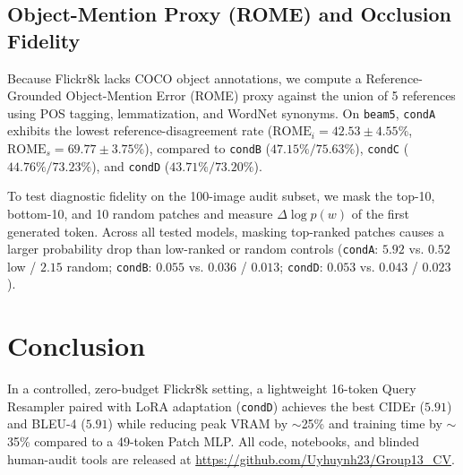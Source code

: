 \documentclass[conference]{IEEEtran}
\begin{document}
\begin{table}[t]
\centering
\caption{Efficiency Metrics on Tesla T4 GPU}
\label{tab:efficiency}
\end{table}

\subsection{Object-Mention Proxy (ROME) and Occlusion Fidelity}
Because Flickr8k lacks COCO object annotations, we compute a Reference-Grounded Object-Mention Error (ROME) proxy against the union of 5 references using POS tagging, lemmatization, and WordNet synonyms. On \texttt{beam5}, \texttt{condA} exhibits the lowest reference-disagreement rate ($\text{ROME}_i = 42.53 \pm 4.55\%$, $\text{ROME}_s = 69.77 \pm 3.75\%$), compared to \texttt{condB} ($47.15\% / 75.63\%$), \texttt{condC} ($44.76\% / 73.23\%$), and \texttt{condD} ($43.71\% / 73.20\%$).

To test diagnostic fidelity on the 100-image audit subset, we mask the top-10, bottom-10, and 10 random patches and measure $\Delta \log p(w)$ of the first generated token. Across all tested models, masking top-ranked patches causes a larger probability drop than low-ranked or random controls (\texttt{condA}: $5.92$ vs. $0.52$ low / $2.15$ random; \texttt{condB}: $0.055$ vs. $0.036$ / $0.013$; \texttt{condD}: $0.053$ vs. $0.043$ / $0.023$).

\section{Conclusion}
In a controlled, zero-budget Flickr8k setting, a lightweight 16-token Query Resampler paired with LoRA adaptation (\texttt{condD}) achieves the best CIDEr ($5.91$) and BLEU-4 ($5.91$) while reducing peak VRAM by $\sim$25\% and training time by $\sim$35\% compared to a 49-token Patch MLP. All code, notebooks, and blinded human-audit tools are released at \url{https://github.com/Uyhuynh23/Group13_CV}.
\end{document}
